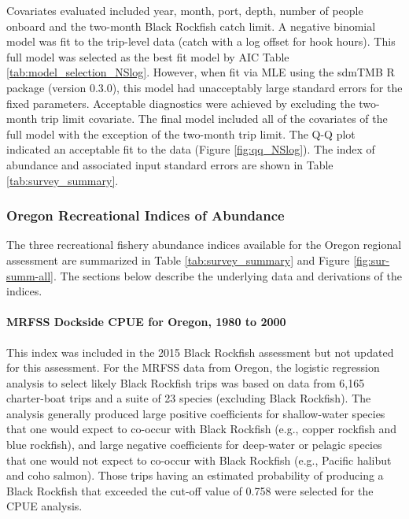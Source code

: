 \documentclass[11pt,
  letterpaper,
]{article}
\begin{document}
Covariates evaluated included year, month, port, depth, number of people onboard and the two-month Black Rockfish catch limit. A negative binomial model was fit to the trip-level data (catch with a log offset for hook hours). This full model was selected as the best fit model by AIC Table \ref{tab:model_selection_NSlog}. However, when fit via MLE using the sdmTMB R package (version 0.3.0), this model had unacceptably large standard errors for the fixed parameters. Acceptable diagnostics were achieved by excluding the two-month trip limit covariate. The final model included all of the covariates of the full model with the exception of the two-month trip limit. The Q-Q plot indicated an acceptable fit to the data (Figure \ref{fig:qq_NSlog}). The index of abundance and associated input standard errors are shown in Table \ref{tab:survey_summary}.

\hypertarget{oregon-recreational-indices-of-abundance}{%
\subsubsection{Oregon Recreational Indices of Abundance}\label{oregon-recreational-indices-of-abundance}}

The three recreational fishery abundance indices available for the Oregon regional assessment are summarized in Table \ref{tab:survey_summary} and Figure \ref{fig:sur-summ-all}. The sections below describe the underlying data and derivations of the indices.

\hypertarget{mrfss-dockside-cpue-for-oregon-1980-to-2000}{%
\paragraph{MRFSS Dockside CPUE for Oregon, 1980 to 2000}\label{mrfss-dockside-cpue-for-oregon-1980-to-2000}}

This index was included in the 2015 Black Rockfish assessment but not updated for this assessment. For the MRFSS data from Oregon, the logistic regression analysis to select likely Black Rockfish trips was based on data from 6,165 charter-boat trips and a suite of 23 species (excluding Black Rockfish). The analysis generally produced large positive coefficients for shallow-water species that one would expect to co-occur with Black Rockfish (e.g., copper rockfish and blue rockfish), and large negative coefficients for deep-water or pelagic species that one would not expect to co-occur with Black Rockfish (e.g., Pacific halibut and coho salmon). Those trips having an estimated probability of producing a Black Rockfish that exceeded the cut-off value of 0.758 were selected for the CPUE analysis.
\end{document}
